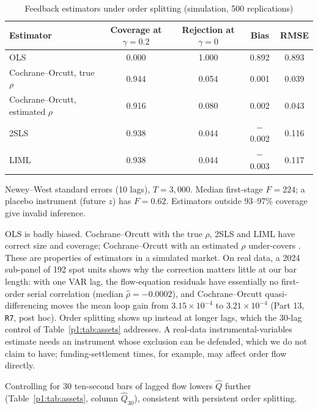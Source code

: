\begin{table}[t]\centering
\begin{threeparttable}
\caption{Feedback estimators under order splitting (simulation, 500 replications)}\label{p1:tab:iv}
\begin{tabular}{lcccc}
\toprule
Estimator & Coverage at $\gamma=0.2$ & Rejection at $\gamma=0$ & Bias & RMSE\\
\midrule
OLS & 0.000 & 1.000 & 0.892 & 0.893\\
Cochrane--Orcutt, true $\rho$ & 0.944 & 0.054 & 0.001 & 0.039\\
Cochrane--Orcutt, estimated $\rho$ & 0.916 & 0.080 & 0.002 & 0.043\\
2SLS & 0.938 & 0.044 & $-$0.002 & 0.116\\
LIML & 0.938 & 0.044 & $-$0.003 & 0.117\\
\bottomrule
\end{tabular}
\begin{tablenotes}\footnotesize\item Newey--West standard errors (10 lags), $T=3{,}000$. Median first-stage $F=224$; a placebo instrument (future $z$) has $F=0.62$. Estimators outside 93--97\% coverage give invalid inference. \end{tablenotes}
\end{threeparttable}
\end{table}

OLS is badly biased. Cochrane--Orcutt with the true $\rho$, 2SLS and LIML have correct size and coverage; Cochrane--Orcutt with an estimated $\rho$ under-covers \citep{p1:cochrane1949,p1:staiger1997}. These are properties of estimators in a simulated market. On real data, a 2024 sub-panel of 192 spot units shows why the correction matters little at our bar length: with one VAR lag, the flow-equation residuals have essentially no first-order serial correlation (median $\hat\rho=-0.0002$), and Cochrane--Orcutt quasi-differencing moves the mean loop gain from $3.15\times10^{-4}$ to $3.21\times10^{-4}$ (Part 13, \texttt{R7}, post hoc). Order splitting shows up instead at longer lags, which the 30-lag control of Table~\ref{p1:tab:assets} addresses. A real-data instrumental-variables estimate needs an instrument whose exclusion can be defended, which we do not claim to have; funding-settlement times, for example, may affect order flow directly.

Controlling for 30 ten-second bars of lagged flow lowers $\hat Q$ further (Table~\ref{p1:tab:assets}, column $\hat Q_{30}$), consistent with persistent order splitting.


